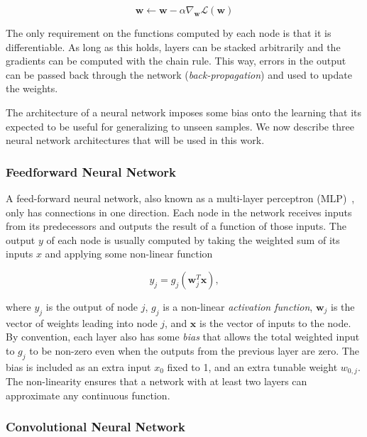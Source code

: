 \begin{equation}
    \mathbf{w} \leftarrow \mathbf{w} - \alpha \nabla_\mathbf{w} \mathcal{L}(\mathbf{w}) 
\end{equation}

The only requirement on the functions computed by each node is that it is differentiable.
As long as this holds, layers can be stacked arbitrarily and the gradients can be computed with the chain rule.
This way, errors in the output can be passed back through the network (\textit{back-propagation}) and used to update the weights.~\cite{russell_artificial_2021,goodfellow_deep_2016}

The architecture of a neural network imposes some bias onto the learning that its expected to be useful for generalizing to unseen samples.
We now describe three neural network architectures that will be used in this work.

\subsubsection{Feedforward Neural Network}

A feed-forward neural network, also known as a multi-layer perceptron (MLP)~\cite{goodfellow_deep_2016}, only has connections in one direction.
Each node in the network receives inputs from its predecessors and outputs the result of a function of those inputs.
The output \(y\) of each node is usually computed by taking the weighted sum of its inputs \(x\) and applying some non-linear function

\begin{equation}
    y_j = g_j(\mathbf{w}_j^T \mathbf{x}),
\end{equation}

where \(y_j\) is the output of node \(j\), \(g_j\) is a non-linear \textit{activation function}, \(\mathbf{w}_j\) is the vector of weights leading into node \(j\), and \(\mathbf{x}\) is the vector of inputs to the node.
By convention, each layer also has some \textit{bias} that allows the total weighted input to \(g_j\) to be non-zero even when the outputs from the previous layer are zero.
The bias is included as an extra input \(x_0\) fixed to 1, and an extra tunable weight \(w_{0,j}\).
The non-linearity ensures that a network with at least two layers can approximate any continuous function.~\cite{russell_artificial_2021}

\subsubsection{Convolutional Neural Network}

